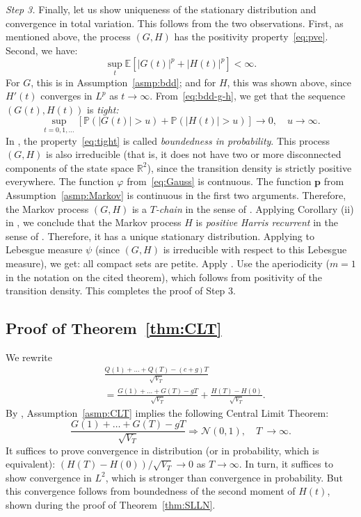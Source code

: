\documentclass[12pt]{amsart}
\theoremstyle{definition}
\begin{document}
{\it Step 3.} Finally, let us show uniqueness of the stationary distribution and convergence in total variation. This follows from the two observations. First, as mentioned above, the process $(G, H)$ has the positivity property~\eqref{eq:pve}. Second, we have:
\begin{equation}
\label{eq:bdd-g-h}
\sup_t\mathbb E\left[|G(t)|^p + |H(t)|^p\right] < \infty.
\end{equation}
For $G$, this is in Assumption~\ref{asmp:bdd}; and for $H$, this was shown above, since $H'(t)$ converges in $L^p$ as $t \to \infty$. From~\eqref{eq:bdd-g-h}, we get that the sequence $(G(t), H(t))$ is {\it tight:}
\begin{equation}
\label{eq:tight}
\sup\limits_{t = 0, 1, \ldots}\left[\mathbb P(|G(t)| > u) + \mathbb P(|H(t)| > u)\right] \to 0,\quad u \to \infty.
\end{equation}
In \cite{MT1992}, the property~\eqref{eq:tight} is called {\it boundedness in probability}. This process $(G, H)$ is also irreducible (that is, it does not have two or more disconnected components of the state space $\mathbb R^2$), since the transition density is strictly positive everywhere. The function $\varphi$ from~\eqref{eq:Gauss} is contnuous. The function $\mathbf{p}$ from Assumption~\ref{asmp:Markov} is continuous in the first two arguments. Therefore, the Markov process $(G, H)$ is a {\it $T$-chain} in the sense of \cite[p.548]{MT1992}. Applying Corollary (ii) in \cite[p.550]{MT1992}, we conclude that the Markov process $H$ is {\it positive Harris recurrent} in the sense of \cite{MT1992}. Therefore, it has a unique stationary distribution. Applying \cite[Theorem 3.4]{MT1992} to Lebesgue measure $\psi$ (since $(G, H)$ is irreducible with respect to this Lebesgue measure), we get: all compact sets are petite. Apply \cite[Theorem 5.2(iii)]{MT1992}. Use the aperiodicity ($m = 1$ in the notation on the cited theorem), which follows from positivity of the transition density. This completes the proof of Step 3. 

\subsection{Proof of Theorem~\ref{thm:CLT}} We rewrite
\begin{align*}
&\frac{Q(1) + \ldots + Q(T) - (c+g)T}{\sqrt{V_T}} \\ & = \frac{G(1) + \ldots + G(T) - gT}{\sqrt{V_T}} + \frac{H(T) - H(0)}{\sqrt{V_T}}.
\end{align*}
By \cite{ETBook}, Assumption~\ref{asmp:CLT} implies the following Central Limit Theorem: 
$$
\frac{G(1) + \ldots + G(T) - gT}{\sqrt{V_T}} \Rightarrow \mathcal N(0, 1),\quad T\ \to \infty.
$$
It suffices to prove convergence in distribution (or in probability, which is equivalent):
$(H(T) - H(0))/\sqrt{V_T} \to 0$ as $T \to \infty$. In turn, it suffices to show convergence in $L^2$, which is stronger than convergence in probability. But this convergence follows from boundedness of the second moment of $H(t)$, shown during the proof of Theorem~\ref{thm:SLLN}. 
\end{document}
